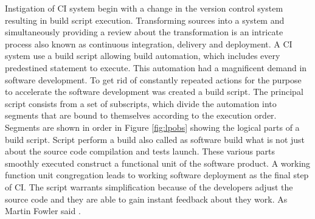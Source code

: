 Instigation of CI system begin with a change in the version control system resulting in build script execution. Transforming sources into a system and simultaneously providing a review about the transformation is an intricate process also known as continuous integration, delivery and deployment. A CI system use a build script allowing build automation, which includes every predestined statement to execute. This automation had a magnificent demand in software development. To get rid of constantly repeated actions for the purpose to accelerate the software development was created a build script. The principal script consists from a set of subscripts, which divide the automation into segments that are bound to themselves according to the execution order. Segments are shown in order in Figure \ref{fig:lpobs} showing the logical parts of a build script. Script perform a build also called as software build what is not just about the source code compilation and tests launch. These various parts smoothly executed construct a functional unit of the software product. A working function unit congregation leads to working software deployment as the final step of CI. The script warrants simplification because of the developers adjust the source code and they are able to gain instant feedback about they work. As Martin Fowler said \cite{MartinFowler}.

